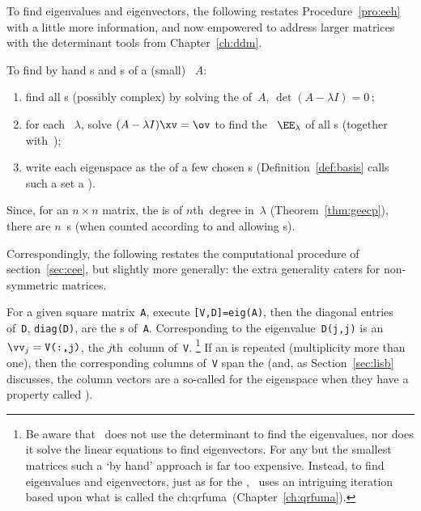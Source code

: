 To find eigenvalues and eigenvectors, the following restates Procedure~\ref{pro:eeh} with a little more information, and now empowered to address larger matrices with the determinant tools from Chapter~\ref{ch:ddm}.

\begin{procedure} \label{pro:geneig}
To find by hand s and s of a (small) ~\(A\):
\begin{enumerate}
\item find all s (possibly complex) by solving the  of~\(A\), \(\det(A-\lambda I)=0\)\,;
\item for each ~\(\lambda\), solve \((A-\lambda I)\xv=\ov\) to find the ~\(\EE_\lambda\) of all s (together with~\ov);
\item write each eigenspace as the  of a few chosen s  (Definition~\ref{def:basis} calls such a set a ).
\end{enumerate}
Since, for an \(n\times n\) matrix, the  is of \(n\)th~degree in~\(\lambda\) (Theorem~\ref{thm:geecp}), there are \(n\)~s (when counted according to  and allowing s).
\end{procedure}

Correspondingly, the following restates the computational procedure of section~\ref{sec:cee}, but slightly more generally: the extra generality caters for non-symmetric matrices.

\begin{compute}
For a given square matrix~\verb|A|, execute \verb|[V,D]=eig(A)|, then the diagonal entries of~\verb|D|, \verb|diag(D)|, are the s of~\verb|A|. 
Corresponding to the eigenvalue~\verb|D(j,j)| is an   \(\vv_j=\verb|V(:,j)|\), the \(j\)th~column of~\verb|V|.  
\footnote{Be aware that \script\ does not use the determinant to find the eigenvalues, nor does it solve the linear equations to find eigenvectors.  
For any but the smallest matrices such a `by hand' approach is far too expensive.  
Instead, to find eigenvalues and eigenvectors, just as for the \svd, \script\ uses an intriguing iteration based upon what is called the \ifcsname ch:qrfuma\endcsname\ (Chapter~\ref{ch:qrfuma})\fi.}
If an  is repeated (multiplicity more than one), then the corresponding columns of~\verb|V| span the  (and, as Section~\ref{sec:lisb} discusses, the column vectors are a so-called  for the eigenspace when they have a property called ). 
\end{compute}


